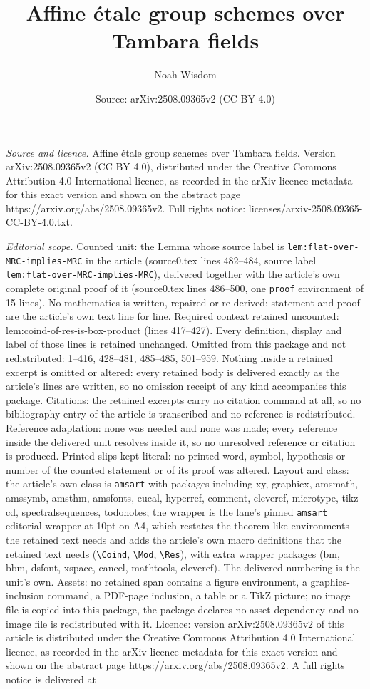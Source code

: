 \documentclass[10pt,a4paper]{amsart}
\title[Affine \'{e}tale group schemes over Tambara fields]{Affine \'{e}tale group schemes over Tambara fields}
\author{Noah Wisdom}
\date{Source: arXiv:2508.09365v2 (CC BY 4.0)}
\begin{document}
\maketitle

\noindent\emph{Source and licence.} Affine \'{e}tale group schemes over Tambara fields. Version arXiv:2508.09365v2 (CC BY 4.0), distributed under the Creative Commons Attribution 4.0 International licence, as recorded in the arXiv licence metadata for this exact version and shown on the abstract page https://arxiv.org/abs/2508.09365v2. Full rights notice: licenses/arxiv-2508.09365-CC-BY-4.0.txt.\par\smallskip

\noindent\textit{Editorial scope.} Counted unit: the Lemma whose source label is \texttt{lem:flat-over-MRC-implies-MRC} in the article (source0.tex lines 482--484, source label \texttt{lem:flat-over-MRC-implies-MRC}), delivered together with the article's own complete original proof of it (source0.tex lines 486--500, one \texttt{proof} environment of 15 lines). No mathematics is written, repaired or re-derived: statement and proof are the article's own text line for line. Required context retained uncounted: lem:coind-of-res-is-box-product (lines 417--427). Every definition, display and label of those lines is retained unchanged. Omitted from this package and not redistributed: 1--416, 428--481, 485--485, 501--959. Nothing inside a retained excerpt is omitted or altered: every retained body is delivered exactly as the article's lines are written, so no omission receipt of any kind accompanies this package. Citations: the retained excerpts carry no citation command at all, so no bibliography entry of the article is transcribed and no reference is redistributed. Reference adaptation: none was needed and none was made; every reference inside the delivered unit resolves inside it, so no unresolved reference or citation is produced. Printed slips kept literal: no printed word, symbol, hypothesis or number of the counted statement or of its proof was altered. Layout and class: the article's own class is \texttt{amsart} with packages including xy, graphicx, amsmath, amssymb, amsthm, amsfonts, eucal, hyperref, comment, cleveref, microtype, tikz-cd, spectralsequences, todonotes; the wrapper is the lane's pinned \texttt{amsart} editorial wrapper at 10pt on A4, which restates the theorem-like environments the retained text needs and adds the article's own macro definitions that the retained text needs (\texttt{\textbackslash Coind}, \texttt{\textbackslash Mod}, \texttt{\textbackslash Res}), with extra wrapper packages (bm, bbm, dsfont, xspace, cancel, mathtools, cleveref). The delivered numbering is the unit's own. Assets: no retained span contains a figure environment, a graphics-inclusion command, a PDF-page inclusion, a table or a TikZ picture; no image file is copied into this package, the package declares no asset dependency and no image file is redistributed with it. Licence: version arXiv:2508.09365v2 of this article is distributed under the Creative Commons Attribution 4.0 International licence, as recorded in the arXiv licence metadata for this exact version and shown on the abstract page https://arxiv.org/abs/2508.09365v2. A full rights notice is delivered at 
\end{document}
